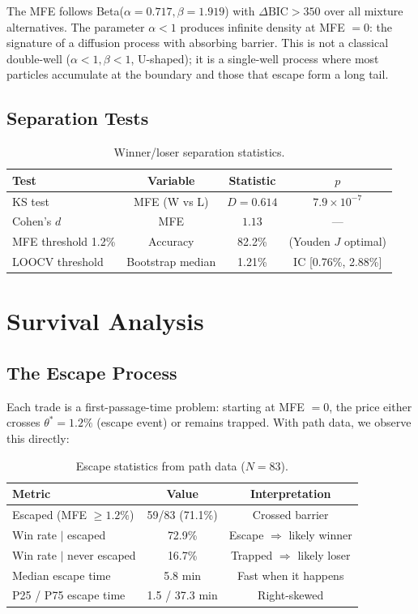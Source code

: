 \documentclass[11pt,a4paper]{article}
\begin{document}
The MFE follows Beta($\alpha = 0.717, \beta = 1.919$) with $\Delta\text{BIC} > 350$ over all mixture alternatives. The parameter $\alpha < 1$ produces infinite density at MFE $= 0$: the signature of a diffusion process with absorbing barrier. This is not a classical double-well ($\alpha < 1, \beta < 1$, U-shaped); it is a single-well process where most particles accumulate at the boundary and those that escape form a long tail.

\subsection{Separation Tests}

\begin{table}[H]
\centering
\caption{Winner/loser separation statistics.}
\begin{tabular}{lccc}
\toprule
\textbf{Test} & \textbf{Variable} & \textbf{Statistic} & $p$ \\
\midrule
KS test & MFE (W vs L) & $D = 0.614$ & $7.9 \times 10^{-7}$ \\
Cohen's $d$ & MFE & $1.13$ & --- \\
MFE threshold 1.2\% & Accuracy & 82.2\% & (Youden $J$ optimal) \\
LOOCV threshold & Bootstrap median & 1.21\% & IC [0.76\%, 2.88\%] \\
\bottomrule
\end{tabular}
\end{table}


\section{Survival Analysis}
\label{sec:survival}

\subsection{The Escape Process}

Each trade is a first-passage-time problem: starting at MFE $= 0$, the price either crosses $\theta^* = 1.2\%$ (escape event) or remains trapped. With path data, we observe this directly:

\begin{table}[H]
\centering
\caption{Escape statistics from path data ($N=83$).}
\begin{tabular}{lcc}
\toprule
\textbf{Metric} & \textbf{Value} & \textbf{Interpretation} \\
\midrule
Escaped (MFE $\geq 1.2\%$) & 59/83 (71.1\%) & Crossed barrier \\
Win rate $|$ escaped & 72.9\% & Escape $\Rightarrow$ likely winner \\
Win rate $|$ never escaped & 16.7\% & Trapped $\Rightarrow$ likely loser \\
Median escape time & 5.8 min & Fast when it happens \\
P25 / P75 escape time & 1.5 / 37.3 min & Right-skewed \\
\bottomrule
\end{tabular}
\end{table}
\end{document}
